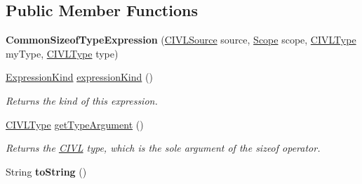 \subsection*{Public Member Functions}
\begin{DoxyCompactItemize}
\item 
\hypertarget{classedu_1_1udel_1_1cis_1_1vsl_1_1civl_1_1model_1_1common_1_1expression_1_1CommonSizeofTypeExpression_a78af337bd514eea1ecdc1ee23526de5c}{}{\bfseries Common\+Sizeof\+Type\+Expression} (\hyperlink{interfaceedu_1_1udel_1_1cis_1_1vsl_1_1civl_1_1model_1_1IF_1_1CIVLSource}{C\+I\+V\+L\+Source} source, \hyperlink{interfaceedu_1_1udel_1_1cis_1_1vsl_1_1civl_1_1model_1_1IF_1_1Scope}{Scope} scope, \hyperlink{interfaceedu_1_1udel_1_1cis_1_1vsl_1_1civl_1_1model_1_1IF_1_1type_1_1CIVLType}{C\+I\+V\+L\+Type} my\+Type, \hyperlink{interfaceedu_1_1udel_1_1cis_1_1vsl_1_1civl_1_1model_1_1IF_1_1type_1_1CIVLType}{C\+I\+V\+L\+Type} type)\label{classedu_1_1udel_1_1cis_1_1vsl_1_1civl_1_1model_1_1common_1_1expression_1_1CommonSizeofTypeExpression_a78af337bd514eea1ecdc1ee23526de5c}

\item 
\hyperlink{enumedu_1_1udel_1_1cis_1_1vsl_1_1civl_1_1model_1_1IF_1_1expression_1_1Expression_1_1ExpressionKind}{Expression\+Kind} \hyperlink{classedu_1_1udel_1_1cis_1_1vsl_1_1civl_1_1model_1_1common_1_1expression_1_1CommonSizeofTypeExpression_a65d4b219cccf5d54d12f0286520b153d}{expression\+Kind} ()
\begin{DoxyCompactList}\small\item\em Returns the kind of this expression. \end{DoxyCompactList}\item 
\hyperlink{interfaceedu_1_1udel_1_1cis_1_1vsl_1_1civl_1_1model_1_1IF_1_1type_1_1CIVLType}{C\+I\+V\+L\+Type} \hyperlink{classedu_1_1udel_1_1cis_1_1vsl_1_1civl_1_1model_1_1common_1_1expression_1_1CommonSizeofTypeExpression_a04a5ab7cabccde76960ba1e271a5e4c8}{get\+Type\+Argument} ()
\begin{DoxyCompactList}\small\item\em Returns the \hyperlink{classedu_1_1udel_1_1cis_1_1vsl_1_1civl_1_1CIVL}{C\+I\+V\+L} type, which is the sole argument of the sizeof operator. \end{DoxyCompactList}\item 
\hypertarget{classedu_1_1udel_1_1cis_1_1vsl_1_1civl_1_1model_1_1common_1_1expression_1_1CommonSizeofTypeExpression_aa59814a7282ecdeebd3baa882134b1fa}{}String {\bfseries to\+String} ()\label{classedu_1_1udel_1_1cis_1_1vsl_1_1civl_1_1model_1_1common_1_1expression_1_1CommonSizeofTypeExpression_aa59814a7282ecdeebd3baa882134b1fa}


\end{DoxyCompactItemize}
